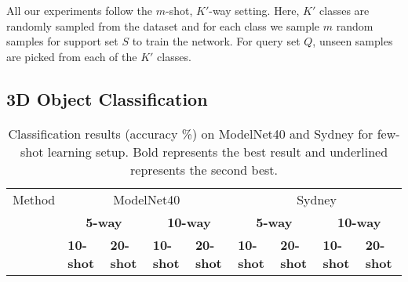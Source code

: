 \documentclass{article}
\begin{document}
 All our experiments follow the $m$-shot, $K'$-way setting. Here, $K'$ classes are randomly sampled from the dataset and for each class we sample $m$ random samples for support set $S$ to train the network. For query set $Q$, unseen samples are picked from each of the $K'$ classes.


\subsection{3D Object Classification}
\begin{table}[tbp]
	\caption{Classification results (accuracy \%) on ModelNet40 and Sydney for few-shot learning setup. Bold represents the best result and underlined represents the second best. }
	\label{Classification}
	\centering
	\tiny
	\setlength{\tabcolsep}{2.5pt}
	\begin{tabular}{lllllllll}
		\toprule
		Method & \multicolumn{4}{c}{ModelNet40} & \multicolumn{4}{c}{Sydney}\\
		\cmidrule(r){2-9}
		& \multicolumn{2}{c}{\textbf{5-way}} & \multicolumn{2}{c}{\textbf{10-way}}& \multicolumn{2}{c}{\textbf{5-way}}& \multicolumn{2}{c}{\textbf{10-way}}\\
		\cmidrule(r){2-9}
		& \textbf{10-shot} & \textbf{20-shot} & \textbf{10-shot} & \textbf{20-shot} & \textbf{10-shot} & \textbf{20-shot} & \textbf{10-shot} & \textbf{20-shot}\\
		\midrule
		

\end{tabular}
\end{table}
\end{document}
